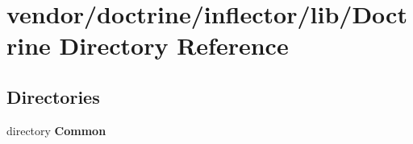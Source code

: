 \section{vendor/doctrine/inflector/lib/\+Doctrine Directory Reference}
\label{dir_c45541b8d011040b5139068d502afdeb}
\subsection*{Directories}
\begin{DoxyCompactItemize}
\item 
directory {\bf Common}
\end{DoxyCompactItemize}
